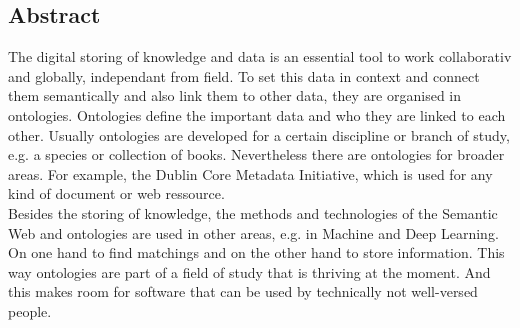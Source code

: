 %
\pagestyle{empty}

\subsection*{Abstract}

The digital storing of knowledge and data is an essential tool to work
collaborativ and globally, independant from  field. To set this data in context
and connect them semantically and also link them to other data, they are
organised in ontologies. Ontologies define the important data and who they are
linked to each other. Usually ontologies are developed for a certain discipline
or branch of study, e.g. a species or collection of books. Nevertheless there
are ontologies for broader areas. For example, the Dublin Core Metadata
Initiative, which is used for any kind of document or web ressource.\\
Besides the storing of knowledge, the methods and technologies of the Semantic
Web and ontologies are used in other areas, e.g. in Machine and Deep Learning.
On one hand to find matchings and on the other hand to store information. This
way ontologies are part of a field of study that is thriving at the moment. And
this makes room for software that can be used by technically not well-versed
people. 

